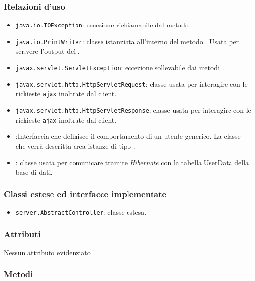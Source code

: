 \subsubsection*{Relazioni d'uso}

\begin{itemize}
	\item \texttt{java.io.IOException}: eccezione richiamabile dal metodo .
	\item \texttt{java.io.PrintWriter}: classe istanziata all'interno del metodo . Usata per scrivere l'output del .
	\item \texttt{javax.servlet.ServletException}: eccezione sollevabile dai metodi .
	\item \texttt{javax.servlet.http.HttpServletRequest}: classe usata per interagire con le richieste \texttt{ajax} inoltrate dal client.
	\item \texttt{javax.servlet.http.HttpServletResponse}: classe usata per interagire con le richieste \texttt{ajax} inoltrate dal client.
	\item {}:Interfaccia che definisce il comportamento di un utente generico. La classe che verrà descritta crea istanze di tipo .
	\item {}: classe usata per comunicare tramite \textit{Hibernate} con la tabella UserData della base di dati.
\end{itemize}

\subsubsection*{Classi estese ed interfacce implementate}
\begin{itemize}
	\item \texttt{server.AbstractController}: classe estesa.
\end{itemize}

\subsubsection*{Attributi}

Nessun attributo evidenziato

\subsubsection*{Metodi}

